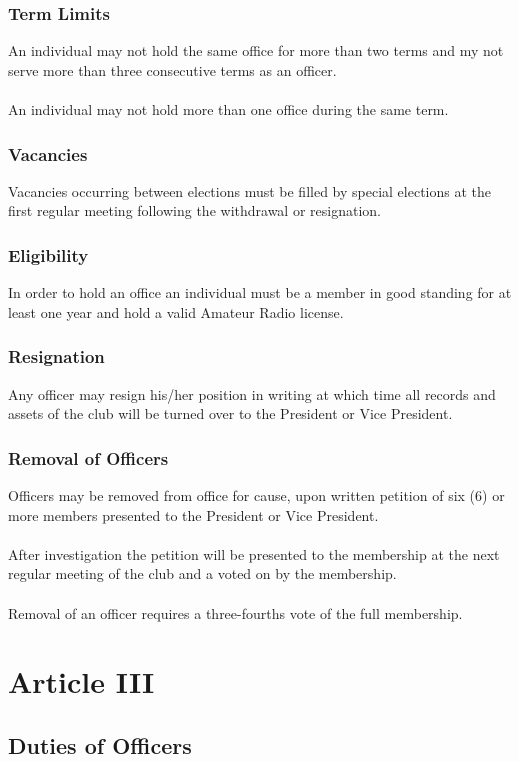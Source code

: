 \documentclass[english,12pt,letterpaper]{article}
\begin{document}
	\subsubsection*{Term Limits}
	An individual may not hold the same office for more than two terms and my not serve more than three consecutive terms as an officer. \\
	\\
	An individual may not hold more than one office during the same term.
	\subsubsection*{Vacancies}
	Vacancies occurring between elections must be filled by special elections at the first regular meeting following the withdrawal or resignation.
	\subsubsection*{Eligibility}
	In order to hold an office an individual must be a member in good standing for at least one year and hold a valid Amateur Radio license.
	\subsubsection*{Resignation}
	Any officer may resign his/her position in writing at which time all records and assets of the club will be turned over to the President or Vice President.
	\subsubsection*{Removal of Officers}
	Officers may be removed from office for cause, upon written petition of six (6) or more members presented to the President or Vice President. \\
	\\
	After investigation the petition will be presented to the membership at the next regular meeting of the club and a voted on by the membership. \\
	\\
	Removal of an officer requires a three-fourths vote of the full membership.
	\section*{Article III}
	\subsection*{Duties of Officers}
\end{document}
